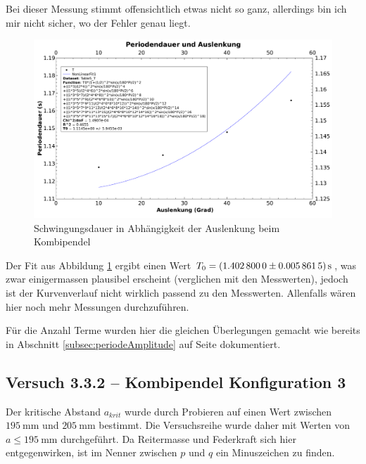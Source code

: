 Bei dieser Messung stimmt offensichtlich etwas nicht so ganz, allerdings bin ich
mir nicht sicher, wo der Fehler genau liegt.


\begin{figure}[h!]
    \centering
    \includegraphics[width=\textwidth]{images/331b.pdf}
    \caption{%
        Schwingungsdauer in Abh\"angigkeit der Auslenkung beim Kombipendel
    }
    \label{fig:331b}
\end{figure}

Der   Fit   aus   Abbildung   \ref{fig:331b}  ergibt   einen   Wert   $T_0   =
\SI[separate-uncertainty  = true]{1.4028  \pm  0.0058615}{\second}$, was  zwar
einigermassen plausibel erscheint (verglichen  mit den Messwerten), jedoch ist
der Kurvenverlauf nicht wirklich passend zu den Messwerten. Allenfalls w\"aren
hier noch mehr Messungen durchzuf\"uhren.

F\"ur   die   Anzahl   Terme   wurden   hier   die   gleichen   \"Uberlegungen
gemacht  wie  bereits  in Abschnitt  \ref{subsec:periodeAmplitude}  auf  Seite
\pageref{subsec:periodeAmplitude} dokumentiert.




\clearpage
\subsection{Versuch 3.3.2 -- Kombipendel Konfiguration 3}
\label{subsec:kombiKonfig3}

Der  kritische  Abstand  $a_{krit}$  wurde  durch  Probieren  auf  einen  Wert
zwischen  $\SI{195}{\milli\meter}$ und  $\SI{205}{\milli\meter}$ bestimmt. Die
Versuchsreihe  wurde  daher mit  Werten  von  $a \leq  \SI{195}{\milli\meter}$
durchgef\"uhrt. Da Reitermasse und Federkraft sich hier entgegenwirken, ist im
Nenner zwischen $p$ und $q$ ein Minuszeichen zu finden.

